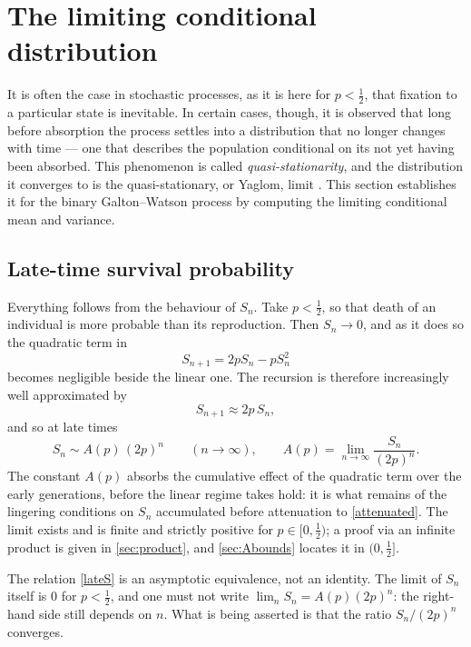 \section{The limiting conditional distribution}
\label{sec:qsd}

It is often the case in stochastic processes, as it is here for $p<\tfrac12$, that
fixation to a particular state is inevitable. In certain cases, though, it is
observed that long before absorption the process settles into a distribution that no
longer changes with time --- one that describes the population conditional on its
not yet having been absorbed. This phenomenon is called \emph{quasi-stationarity},
and the distribution it converges to is the quasi-stationary, or Yaglom, limit
\cite{Yaglom1947,Athreya1972}. This section establishes it for the binary
Galton--Watson process by computing the limiting conditional mean and variance.

\subsection{Late-time survival probability}
\label{sec:lateS}

Everything follows from the behaviour of $S_n$. Take $p<\tfrac12$, so that death of
an individual is more probable than its reproduction. Then $S_n\to0$, and as it does
so the quadratic term in
\begin{equation*}
S_{n+1} = 2pS_n - pS_n^2
\end{equation*}
becomes negligible beside the linear one. The recursion is therefore increasingly
well approximated by
\begin{equation}
\label{attenuated}
S_{n+1} \approx 2p\,S_n,
\end{equation}
and so at late times
\begin{equation}
\label{lateS}
S_n \sim A(p)\,(2p)^n \qquad (n\to\infty),
\qquad
A(p) = \lim_{n\to\infty}\frac{S_n}{(2p)^n}.
\end{equation}
The constant $A(p)$ absorbs the cumulative effect of the quadratic term over the
early generations, before the linear regime takes hold: it is what remains of the
lingering conditions on $S_n$ accumulated before attenuation to \cref{attenuated}.
The limit exists and is finite and strictly positive for $p\in[0,\tfrac12)$; a proof
via an infinite product is given in \cref{sec:product}, and \cref{sec:Abounds}
locates it in $(0,\tfrac12]$.

\begin{remark}
The relation \cref{lateS} is an asymptotic equivalence, not an identity. The limit of
$S_n$ itself is $0$ for $p<\tfrac12$, and one must not write
$\lim_n S_n = A(p)(2p)^n$: the right-hand side still depends on $n$. What is being
asserted is that the ratio $S_n/(2p)^n$ converges.
\end{remark}

